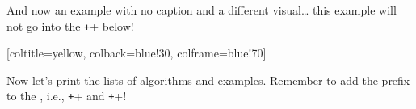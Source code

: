 \documentclass{article}
\begin{document}
And now an example with no caption and a different visual…  this example will not go into the \texttt+\listofexamples+ below!

\begin{cthexample}{}[coltitle=yellow, colback=blue!30, colframe=blue!70]
  \emph{\kant[4]}
\end{cthexample}

Now let's print the lists of algorithms and examples. Remember to add the prefix  to the , i.e., \texttt+\cthlistofalgorithms+ and \texttt+\cthlistofexamples+!

\cthlistofalgorithms

\cthlistofexamples
\end{document}
